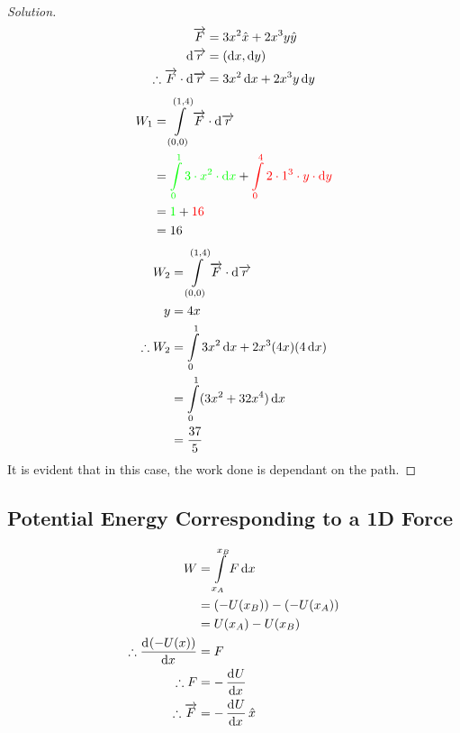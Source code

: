 \documentclass[fleqn]{article}
\theoremstyle{definition}
\theoremstyle{theorem}
\newenvironment{solution}
{\begin{proof}[Solution]\let\qed\relax}
	{\end{proof}}
\begin{document}
\begin{solution}
	\begin{align*}
		\overrightarrow{F} &= 3 x^2 \hat{x} + 2 x^3 y \hat{y}\\
		\dif \overrightarrow{r} &= (\dif x, \dif y) \\
		\therefore \overrightarrow{F} \cdot \dif \overrightarrow{r} &= 3 x^2 \dif x + 2 x^3 y \dif y
	\end{align*}
	\begin{align*}
		W_1 &= \int\displaylimits_{(0,0)}^{(1,4)} \overrightarrow{F} \cdot \dif \overrightarrow{r} \\
		&= {\color{green} \int\displaylimits_{0}^{1} 3 \cdot x^2 \cdot \dif x} + {\color{red} \int\displaylimits_{0}^{4} 2 \cdot 1^3 \cdot y \cdot \dif y} \\
		&= {\color{green} 1} + {\color{red} 16} \\
		&= 16
	\end{align*}
	{
		\color{blue}
		\begin{align*}
			W_2 &= \int\displaylimits_{(0,0)}^{(1,4)}  \overrightarrow{F} \cdot \dif \overrightarrow{r} \\
			y &= 4x \\
			\therefore W_2 &= \int\displaylimits_{0}^{1} 3x^2 \dif x + 2 x^3 (4x) (4 \dif x) \\
			&= \int\displaylimits_{0}^{1} (3x^2 + 32x^4) \dif x \\
			&= \dfrac{37}{5} \\
		\end{align*}
	}
	It is evident that in this case, the work done is dependant on the path.
\end{solution}

\subsection{Potential Energy Corresponding to a 1D Force}


\begin{align*}
	W &= \int\displaylimits_{x_A}^{x_B} F \dif x \\
	&= (-U(x_B)) - (-U(x_A)) \\
	&= U(x_A) - U(x_B)\\
	\therefore \dod{(-U(x))}{x} &= F \\
	\therefore F &= - \dod{U}{x} \\
	\therefore \overrightarrow{F} &= - \dod{U}{x} \hat{x} 
\end{align*}
\end{document}
